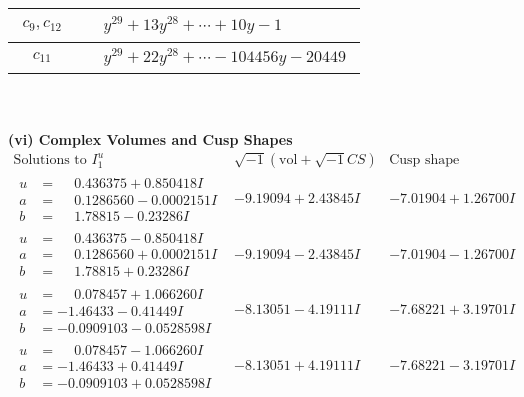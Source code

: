 \documentclass[1p]{elsarticle_modified}
\theoremstyle{definition}
\newcommand{\I}{\sqrt{-1}}
\begin{document}
\begin{tabular}{m{50pt}|m{274pt}}
\hline $$\begin{aligned}c_{9},c_{12}\end{aligned}$$&$\begin{aligned}
&y^{29}+13 y^{28}+\cdots+10 y-1
\end{aligned}$\\
\hline $$\begin{aligned}c_{11}\end{aligned}$$&$\begin{aligned}
&y^{29}+22 y^{28}+\cdots-104456 y-20449
\end{aligned}$\\
\hline
\end{tabular}\\~\\
\newpage\flushleft \textbf{(vi) Complex Volumes and Cusp Shapes}
$$\begin{array}{c|c|c}  
\text{Solutions to }I^u_{1}& \I (\text{vol} + \sqrt{-1}CS) & \text{Cusp shape}\\
 \hline 
\begin{aligned}
u &= \phantom{-}0.436375 + 0.850418 I \\
a &= \phantom{-}0.1286560 - 0.0002151 I \\
b &= \phantom{-}1.78815 - 0.23286 I\end{aligned}
 & -9.19094 + 2.43845 I & -7.01904 + 1.26700 I \\ \hline\begin{aligned}
u &= \phantom{-}0.436375 - 0.850418 I \\
a &= \phantom{-}0.1286560 + 0.0002151 I \\
b &= \phantom{-}1.78815 + 0.23286 I\end{aligned}
 & -9.19094 - 2.43845 I & -7.01904 - 1.26700 I \\ \hline\begin{aligned}
u &= \phantom{-}0.078457 + 1.066260 I \\
a &= -1.46433 - 0.41449 I \\
b &= -0.0909103 - 0.0528598 I\end{aligned}
 & -8.13051 - 4.19111 I & -7.68221 + 3.19701 I \\ \hline\begin{aligned}
u &= \phantom{-}0.078457 - 1.066260 I \\
a &= -1.46433 + 0.41449 I \\
b &= -0.0909103 + 0.0528598 I\end{aligned}
 & -8.13051 + 4.19111 I & -7.68221 - 3.19701 I \\ \hline\begin{aligned}

\end{aligned}
\end{array}$$
\end{document}
